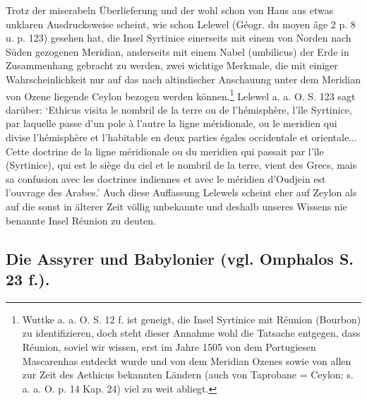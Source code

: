\documentclass[a4paper, 11pt, oneside]{article}
\begin{document}
Trotz der miserabeln Überlieferung und der wohl schon von Haus aus etwas unklaren Ausdrucksweise scheint, wie schon Lelewel (Géogr. du moyen âge 2 p. 8 u. p. 123) gesehen hat, die Insel Syrtinice einerseits mit einem von Norden nach Süden gezogenen Meridian, anderseits mit einem Nabel (umbilicus) der Erde in Zusammenhang gebracht zu werden, zwei wichtige Merkmale, die mit einiger Wahrscheinlichkeit nur auf das nach altindischer Anschauung unter dem Meridian von Ozene liegende Ceylon bezogen werden können.\footnote{Wuttke a. a. O. S. 12 f. ist geneigt, die Insel Syrtinice mit Réunion (Bourbon) zu identifizieren, doch steht dieser Annahme wohl die Tatsache entgegen, dass Réunion, soviel wir wissen, erst im Jahre 1505 von dem Portugiesen Mascarenhas entdeckt wurde und von dem Meridian Ozenes sowie von allen zur Zeit des Aethicus bekannten Ländern (auch von Taprobane = Ceylon; s. a. a. O. p. 14 Kap. 24) viel zu weit abliegt.} Lelewel a. a. O. S. 123 sagt darüber: `Ethicus visita le nombril de la terre ou de l'hémisphère, l'île Syrtinice, par laquelle passe d'un pole à l'autre la ligne méridionale, ou le meridien qui divise l'hémisphère et l'habitable en deux parties égales occidentale et orientale... Cette doctrine de la ligne méridionale ou du meridien qui passait par l'île (Syrtinice), qui est le siège du ciel et le nombril de la terre, vient des Grecs, mais sa confusion avec les doctrines indiennes et avec le méridien d'Oudjein est l'ouvrage des Arabes.' Auch diese Auffassung Lelewels scheint eher auf Zeylon als auf die sonst in älterer Zeit völlig unbekannte und deshalb unseres Wissens nie benannte Insel Réunion zu deuten.

\subsection{Die Assyrer und Babylonier (vgl. Omphalos S. 23 f.).}
\end{document}
